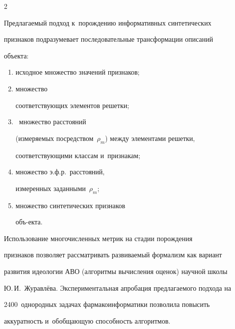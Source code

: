 \begin{multicols}{2}
\vspace*{-2pt}



    Предлагаемый подход к~порождению информативных синтетических 

признаков подразумевает последовательные трансформации описаний 

объекта:\\[-13pt]

\begin{enumerate}[(1)]

\item исходное множество значений признаков;\\[-13.5pt]

\item множество 

соответствующих элементов решетки;\\[-13.5pt] 

\item ~множество расстояний 

(измеряемых посредством~$\rho_m$) между элементами решетки, 

соответствующими классам и~признакам;\\[-13.5pt]

\item множество э.ф.р.\ расстояний, 

измеренных заданными~$\rho_m$;\\[-13.5pt] 

\item множество синтетических признаков 

объ-\linebreak екта.

\end{enumerate}



\noindent

 Использование многочисленных метрик на стадии порождения 

признаков позволяет рассматривать развиваемый формализм как вариант 

развития идеологии АВО (алгоритмы вычисления \mbox{оценок}) научной школы 

Ю.\,И.~Журавлёва. Экспериментальная апробация предлагаемого подхода на 

2400~однородных задачах фармакоинформатики позволила повысить 

аккуратность и~обобщающую способность алгоритмов. 






\end{multicols}
